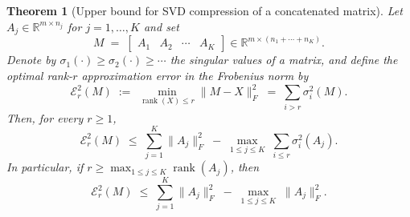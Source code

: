 \documentclass[10pt]{article} %
\newtheorem{theorem}{Theorem}
\begin{document}
\begin{theorem}[Upper bound for SVD compression of a concatenated matrix]
\label{thm:weyl-upper-bound}
Let $A_j \in \mathbb{R}^{m \times n_j}$ for $j=1,\dots,K$ and set
\[
  M \;=\; 
  \begin{bmatrix}
    A_1 & A_2 & \cdots & A_K
  \end{bmatrix}
  \in \mathbb{R}^{m \times (n_1+\cdots+n_K)}.
\]
Denote by $\sigma_1(\cdot) \ge \sigma_2(\cdot) \ge \cdots$ the singular values
of a matrix, and define the optimal rank-$r$ approximation error in the Frobenius
norm by
\[
  \mathcal{E}_r^2(M)
  \;:=\;
  \min_{\operatorname{rank}(X)\le r} \|M-X\|_F^2
  \;=\;\sum_{i>r} \sigma_i^2(M).
\]
Then, for every $r \ge 1$,
\begin{equation}
\label{eq:weyl-upper}
  \mathcal{E}_r^2(M)
  \;\le\;
  \sum_{j=1}^K \|A_j\|_F^2
  \;-\;
  \max_{1 \le j \le K} \;
  \sum_{i \le r} \sigma_i^2(A_j).
\end{equation}
In particular, if $r \ge \max_{1 \le j \le K} \operatorname{rank}(A_j)$, then
\[
  \mathcal{E}_r^2(M)
  \;\le\;
  \sum_{j=1}^K \|A_j\|_F^2
  \;-\;
  \max_{1 \le j \le K} \;
  \| A_j \|_F^2.
\]
\end{theorem}

\end{document}
